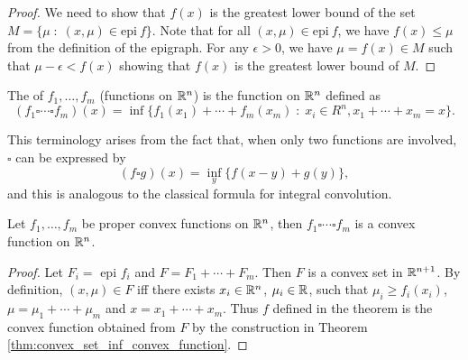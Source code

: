 \documentclass[11pt,a4paper]{article}
\begin{document}
\begin{proof}
    We need to show that $f(x)$ is the greatest lower bound of the set $M = \{\mu\;:\;(x,\mu)\in \text{epi}\ f\}$. Note that for all $(x,\mu)\in \text{epi}\ f$, we have $f(x)\le \mu$ from the definition of the epigraph. For any $\epsilon>0$, we have $\mu = f(x)\in M$ such that $\mu-\epsilon<f(x)$ showing that $f(x)$ is the greatest lower bound of $M$.
\end{proof}

\begin{definition}
    The  of $f_1,\ldots,f_m$ (functions on $\mathbb{R}^n$) is the function on $\mathbb{R}^n$ defined as 
    \begin{equation*}
        (f_1\square \cdots \square f_m)(x) = \inf\{f_1(x_1)+\cdots + f_m(x_m)\;:\;x_i\in R^n,x_1+\cdots+x_m = x\}.
    \end{equation*} 
\end{definition}

\begin{remark}
    This terminology arises from the fact that, when only two functions are involved, $\square$ can be expressed by
    \begin{equation*}
        (f\square g)(x) = \inf_{y} \{f(x-y)+g(y)\},
    \end{equation*}
    and this is analogous to the classical formula for integral convolution.
\end{remark}

\begin{proposition}
    Let $f_1,\ldots,f_m$ be proper convex functions on $\mathbb{R}^n$, then $f_1\square \cdots \square f_m$ is a convex function on $\mathbb{R}^n$.
\end{proposition}

\begin{proof}
    Let $F_i =$ epi $f_i$ and $F = F_1+\cdots + F_m$. Then $F$ is a convex set in $\mathbb{R}^{n+1}$. By definition, $(x,\mu)\in F$ iff there exists $x_i\in \mathbb{R}^n$, $\mu_i\in \mathbb{R}$, such that $\mu_i\ge f_i(x_i)$, $\mu = \mu_1+\cdots+\mu_m$ and $x = x_1+\cdots + x_m$. Thus $f$ defined in the theorem is the convex function obtained from $F$ by the construction in Theorem \ref{thm:convex_set_inf_convex_function}.
\end{proof}
\end{document}
